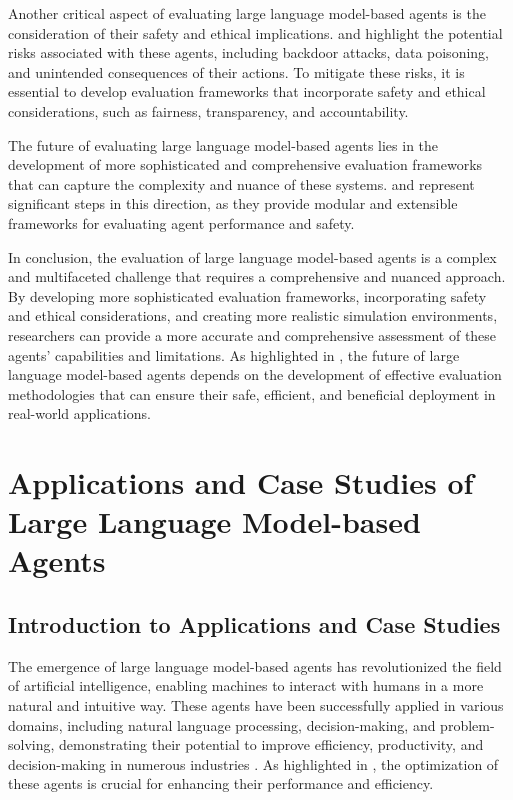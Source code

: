 \documentclass[11pt,a4paper]{article}
\begin{document}
Another critical aspect of evaluating large language model-based agents is the consideration of their safety and ethical implications. \cite{arxiv:2402.11208} and \cite{arxiv:2412.14470} highlight the potential risks associated with these agents, including backdoor attacks, data poisoning, and unintended consequences of their actions. To mitigate these risks, it is essential to develop evaluation frameworks that incorporate safety and ethical considerations, such as fairness, transparency, and accountability.

The future of evaluating large language model-based agents lies in the development of more sophisticated and comprehensive evaluation frameworks that can capture the complexity and nuance of these systems. \cite{arxiv:2402.11443} and \cite{arxiv:2404.06411} represent significant steps in this direction, as they provide modular and extensible frameworks for evaluating agent performance and safety. 

In conclusion, the evaluation of large language model-based agents is a complex and multifaceted challenge that requires a comprehensive and nuanced approach. By developing more sophisticated evaluation frameworks, incorporating safety and ethical considerations, and creating more realistic simulation environments, researchers can provide a more accurate and comprehensive assessment of these agents' capabilities and limitations. As highlighted in \cite{arxiv:2303.18223}, the future of large language model-based agents depends on the development of effective evaluation methodologies that can ensure their safe, efficient, and beneficial deployment in real-world applications.


\section{Applications and Case Studies of Large Language Model-based Agents}



\subsection{Introduction to Applications and Case Studies}


The emergence of large language model-based agents has revolutionized the field of artificial intelligence, enabling machines to interact with humans in a more natural and intuitive way. These agents have been successfully applied in various domains, including natural language processing, decision-making, and problem-solving, demonstrating their potential to improve efficiency, productivity, and decision-making in numerous industries \cite{doi:10.1145/3604237.3626869}. As highlighted in \cite{doi:10.1007/s11704-024-40231-1}, the optimization of these agents is crucial for enhancing their performance and efficiency. 
\end{document}
